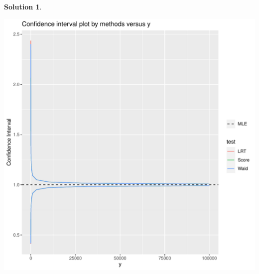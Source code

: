 \documentclass[11pt,letterpaper,english,oneside]{article}\usepackage[]{graphicx}\usepackage[]{color}
\makeatletter
\def\maxwidth{ %
  \ifdim\Gin@nat@width>\linewidth
    \linewidth
  \else
    \Gin@nat@width
  \fi
}
\newenvironment{knitrout}{}{} %
\theoremstyle{definition} %
\newtheorem{solution}{Solution}
\newenvironment{sol}{\begin{solution}\hspace{0pt}}{\end{solution}}
\makeatother
\begin{document}
\begin{sol}
\begin{enumerate}
\begin{knitrout}
\includegraphics[width=\maxwidth]{unnamed-chunk-3-1} 
\end{knitrout}


\end{enumerate}
\end{sol}
\end{document}
